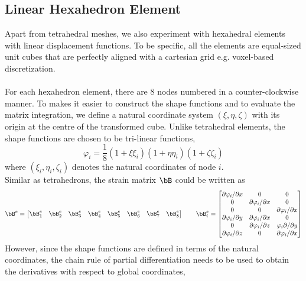 

\subsection{Linear Hexahedron Element}
Apart from tetrahedral meshes, we also experiment with hexahedral elements with linear displacement functions. To be specific, all the elements are equal-sized unit cubes that are perfectly aligned with a cartesian grid e.g. voxel-based discretization.\\
\\
For each hexahedron element, there are 8 nodes numbered in a counter-clockwise manner. To makes it easier to construct the shape functions and to evaluate the matrix integration, we define a natural coordinate system $(\xi,\eta,\zeta)$ with its origin at the centre of the transformed cube. Unlike tetrahedral elements, the shape functions are chosen to be tri-linear functions,\\
\[
    \varphi_i = \frac{1}{8} (1+\xi\xi_{i})(1+\eta\eta_{i})(1+\zeta\zeta_{i})
\]
where $(\xi_{i},\eta_{i},\zeta_{i})$ denotes the natural coordinates of node $i$.\\
Similar as tetrahedrons, the strain matrix $\bB$ could be written as\\
\[
    \bB^e
    = 
    \begin{bmatrix}
    \bB_1^e & \bB_2^e & \bB_3^e & \bB_4^e & \bB_5^e & \bB_6^e & \bB_7^e & \bB_8^e
    \end{bmatrix}
    \quad\quad
    \bB_i^e = 
    \begin{bmatrix}
        \partial \varphi_i / \partial x & 0 & 0 \\
        0 & \partial \varphi_i / \partial x & 0 \\
        0 & 0 & \partial \varphi_i / \partial x \\
        \partial \varphi_i / \partial y & \partial \varphi_i /\partial x & 0 \\
        0 & \partial \varphi_i / \partial z & \varphi_i \partial /\partial y \\
        \partial \varphi_i/ \partial z & 0 & \partial \varphi_i /\partial x \\
    \end{bmatrix}
\]
However, since the shape functions are defined in terms of the natural coordinates, the chain rule of partial differentiation needs to be used to obtain the derivatives with respect to global coordinates,
